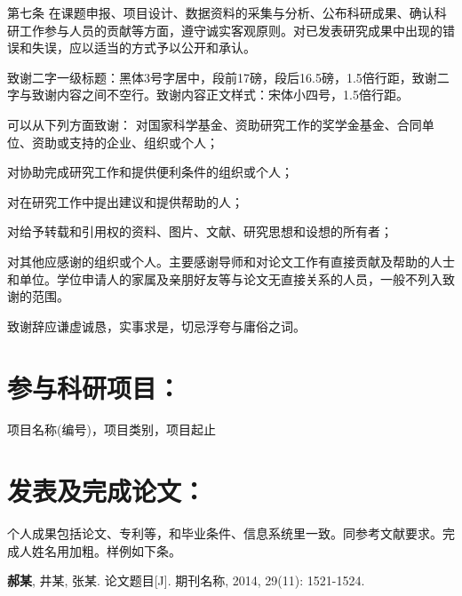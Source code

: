 \documentclass{cqupt_thesis}
\begin{document}
    第七条 在课题申报、项目设计、数据资料的采集与分析、公布科研成果、确认科研工作参与人员的贡献等方面，遵守诚实客观原则。对已发表研究成果中出现的错误和失误，应以适当的方式予以公开和承认。
    
    \begin{acknowledgements}
        致谢二字一级标题：黑体3号字居中，段前17磅，段后16.5磅，1.5倍行距，致谢二字与致谢内容之间不空行。致谢内容正文样式：宋体小四号，1.5倍行距。
        
        可以从下列方面致谢：
        对国家科学基金、资助研究工作的奖学金基金、合同单位、资助或支持的企业、组织或个人；
        
        对协助完成研究工作和提供便利条件的组织或个人；
        
        对在研究工作中提出建议和提供帮助的人；
        
        对给予转载和引用权的资料、图片、文献、研究思想和设想的所有者；
        
        对其他应感谢的组织或个人。主要感谢导师和对论文工作有直接贡献及帮助的人士和单位。学位申请人的家属及亲朋好友等与论文无直接关系的人员，一般不列入致谢的范围。
        
        致谢辞应谦虚诚恳，实事求是，切忌浮夸与庸俗之词。
        
    \end{acknowledgements}

    \begin{mastermainwork}
        \section*{参与科研项目：}
        \begin{achievements}
            \item 项目名称(编号)，项目类别，项目起止  
        \end{achievements}
    	
        \section*{发表及完成论文：}
        \begin{achievements}
            \item 个人成果包括论文、专利等，和毕业条件、信息系统里一致。同参考文献要求。完成人姓名用加粗。样例如下条。
            \item \textbf{郝某}, 井某, 张某. 论文题目[J]. 期刊名称, 2014, 29(11): 1521-1524.
        \end{achievements}
    \end{mastermainwork}
\end{document}
